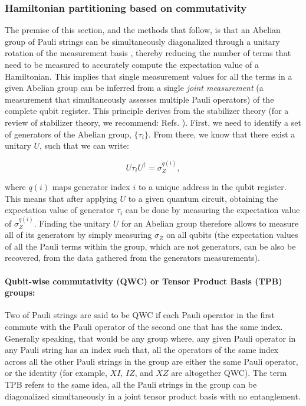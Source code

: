\subsubsection{Hamiltonian partitioning based on commutativity}

The premise of this section, and the methods that follow, is that an Abelian group of Pauli strings can be simultaneously diagonalized through a unitary rotation of the measurement basis \cite{griffiths2005introduction}, thereby reducing the number of terms that need to be measured to accurately compute the expectation value of a Hamiltonian. This implies that single measurement values for all the terms in a given Abelian group can be inferred from a single \textit{joint measurement} (a measurement that simultaneously assesses multiple Pauli operators) of the complete qubit register. This principle derives from the stabilizer theory (for a review of stabilizer theory, we recommend: Refs. \cite{Gottesman1997, nielsenQuantumComputationQuantum2010}). First, we need to identify a set of generators of the Abelian group, $\{ \tau_i\}$. From there, we know that there exist a unitary $U$, such that we can write: 

\begin{equation}
    U \tau_i U^{\dagger} = \sigma_Z^{q(i)},
\end{equation}

where $q(i)$ maps generator index $i$ to a unique address in the qubit register. This means that after applying $U$ to a given quantum circuit, obtaining the expectation value of generator $\tau_i$ can be done by measuring the expectation value of $ \sigma_Z^{q(i)}$. Finding the unitary $U$ for an Abelian group therefore allows to measure all of its generators by simply measuring $\sigma_Z$ on all qubits (the expectation values of all the Pauli terms within the group, which are not generators, can be also be recovered, from the data gathered from the generators measurements). \\

\paragraph{Qubit-wise commutativity (QWC) or Tensor Product Basis (TPB) groups:} Two of Pauli strings are said to be QWC if each Pauli operator in the first commute with the Pauli operator of the second one that has the same index. Generally speaking, that would be any group where, any given Pauli operator in any Pauli string has an index such that, all the operators of the same index across all the other Pauli strings in the group are either the same Pauli operator, or the identity (for example, $XI$, $IZ$, and $XZ$ are altogether QWC). The term TPB refers to the same idea, all the Pauli strings in the group can be diagonalized simultaneously in a joint tensor product basis with no entanglement. 

